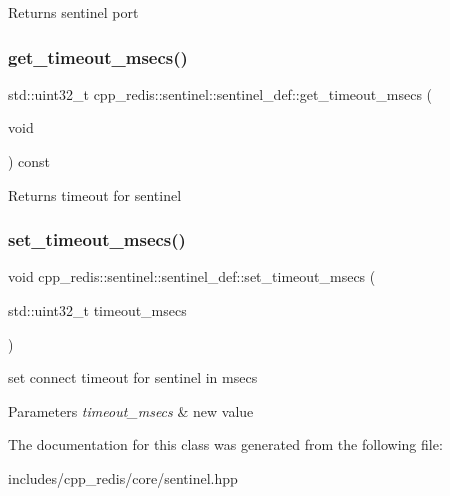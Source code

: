 \begin{DoxyReturn}{Returns}
sentinel port 
\end{DoxyReturn}
\mbox{\label{classcpp__redis_1_1sentinel_1_1sentinel__def_af7aa53bdf7bd56becdad9205e82949c5}} 
\subsubsection{\texorpdfstring{get\+\_\+timeout\+\_\+msecs()}{get\_timeout\_msecs()}}
{\footnotesize\ttfamily std\+::uint32\+\_\+t cpp\+\_\+redis\+::sentinel\+::sentinel\+\_\+def\+::get\+\_\+timeout\+\_\+msecs (\begin{DoxyParamCaption}\item[{void}]{ }\end{DoxyParamCaption}) const\hspace{0.3cm}{\ttfamily [inline]}}

\begin{DoxyReturn}{Returns}
timeout for sentinel 
\end{DoxyReturn}
\mbox{\label{classcpp__redis_1_1sentinel_1_1sentinel__def_abc234e6c289f7b3d95868ae32343ff92}} 
\subsubsection{\texorpdfstring{set\+\_\+timeout\+\_\+msecs()}{set\_timeout\_msecs()}}
{\footnotesize\ttfamily void cpp\+\_\+redis\+::sentinel\+::sentinel\+\_\+def\+::set\+\_\+timeout\+\_\+msecs (\begin{DoxyParamCaption}\item[{std\+::uint32\+\_\+t}]{timeout\+\_\+msecs }\end{DoxyParamCaption})\hspace{0.3cm}{\ttfamily [inline]}}

set connect timeout for sentinel in msecs 
\begin{DoxyParams}{Parameters}
{\em timeout\+\_\+msecs} & new value \\
\hline
\end{DoxyParams}


The documentation for this class was generated from the following file\+:\begin{DoxyCompactItemize}
\item 
includes/cpp\+\_\+redis/core/sentinel.\+hpp\end{DoxyCompactItemize}
